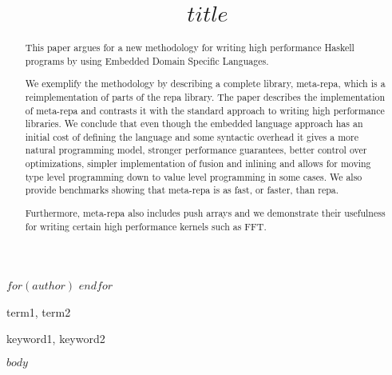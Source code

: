 \documentclass[preprint]{sigplanconf}
\begin{document}
\copyrightdata{[to be supplied]} 


\title{$title$}

$for(author)$
$endfor$

\maketitle

\begin{abstract}
This paper argues for a new methodology for writing high performance
Haskell programs by using Embedded Domain Specific Languages. 

We exemplify the methodology by describing a complete library,
meta-repa, which is a reimplementation of parts of the repa
library. The paper describes the implementation of meta-repa and
contrasts it with the standard approach to writing high performance
libraries. We conclude that even though the embedded language approach
has an initial cost of defining the language and some syntactic
overhead it gives a more natural programming model, stronger
performance guarantees, better control over optimizations, simpler
implementation of fusion and inlining and allows for moving type level
programming down to value level programming in some cases. We also
provide benchmarks showing that meta-repa is as fast, or faster, than
repa.

Furthermore, meta-repa also includes push arrays and we demonstrate
their usefulness for writing certain high performance kernels such as
FFT.
\end{abstract}


\terms
term1, term2

\keywords
keyword1, keyword2

$body$

\end{document}

